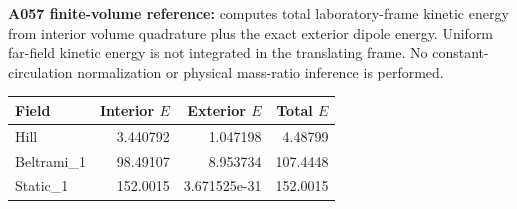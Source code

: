 \documentclass[10pt,a4paper]{article}
\begin{document}
\textbf{A057 finite-volume reference:} computes total laboratory-frame kinetic energy from interior volume quadrature plus the exact exterior dipole energy. Uniform far-field kinetic energy is not integrated in the translating frame. No constant-circulation normalization or physical mass-ratio inference is performed.
\begin{center}\small
\begin{tabular}{lrrr}
\toprule
Field & Interior $E$ & Exterior $E$ & Total $E$\\
\midrule
Hill & 3.440792 & 1.047198 & 4.48799 \\
Beltrami\_1 & 98.49107 & 8.953734 & 107.4448 \\
Static\_1 & 152.0015 & 3.671525e-31 & 152.0015 \\
\bottomrule
\end{tabular}
\end{center}
\end{document}
